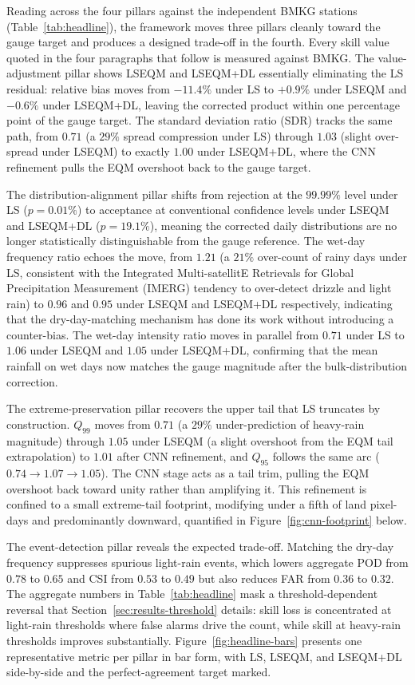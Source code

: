 Reading across the four pillars against the independent BMKG
stations (Table~\ref{tab:headline}), the framework moves three
pillars cleanly toward the gauge target and produces a designed
trade-off in the fourth. Every skill value quoted in the four
paragraphs that follow is measured against BMKG. The value-adjustment pillar shows
LSEQM and LSEQM+DL essentially eliminating the LS residual:
relative bias moves from $-11.4\%$ under LS to $+0.9\%$ under
LSEQM and $-0.6\%$ under LSEQM+DL, leaving the corrected product
within one percentage point of the gauge target. The standard
deviation ratio (SDR) tracks the same path, from $0.71$ (a $29\%$
spread compression under LS) through $1.03$ (slight over-spread
under LSEQM) to exactly $1.00$ under LSEQM+DL, where the CNN
refinement pulls the EQM overshoot back to the gauge target.

The distribution-alignment pillar shifts from rejection at the
$99.99\%$ level under LS ($p = 0.01\%$) to acceptance at
conventional confidence levels under LSEQM and LSEQM+DL ($p =
19.1\%$), meaning the corrected daily distributions are no
longer statistically distinguishable from the gauge reference.
The wet-day frequency ratio echoes the move, from $1.21$ (a
$21\%$ over-count of rainy days under LS, consistent with the
Integrated Multi-satellitE Retrievals for Global Precipitation Measurement (IMERG) tendency to over-detect drizzle and light rain) to $0.96$
and $0.95$ under LSEQM and LSEQM+DL respectively, indicating
that the dry-day-matching mechanism has done its work without
introducing a counter-bias. The wet-day intensity ratio moves
in parallel from $0.71$ under LS to $1.06$ under LSEQM and
$1.05$ under LSEQM+DL, confirming that the mean rainfall on wet
days now matches the gauge magnitude after the bulk-distribution
correction.

The extreme-preservation pillar recovers the upper tail that LS
truncates by construction. $Q_{99}$ moves from $0.71$ (a $29\%$
under-prediction of heavy-rain magnitude) through $1.05$ under
LSEQM (a slight overshoot from the EQM tail extrapolation) to
$1.01$ after CNN refinement, and $Q_{95}$ follows the same arc
($0.74 \rightarrow 1.07 \rightarrow 1.05$). The CNN stage acts
as a tail trim, pulling the EQM overshoot back toward unity
rather than amplifying it. This refinement is confined to a small
extreme-tail footprint, modifying under a fifth of land pixel-days
and predominantly downward, quantified in
Figure~\ref{fig:cnn-footprint} below.

The event-detection pillar reveals the expected trade-off.
Matching the dry-day frequency suppresses spurious light-rain
events, which lowers aggregate POD from $0.78$ to $0.65$ and
CSI from $0.53$ to $0.49$ but also reduces FAR from $0.36$ to
$0.32$. The aggregate numbers in
Table~\ref{tab:headline} mask a threshold-dependent reversal
that Section~\ref{sec:results-threshold} details: skill loss
is concentrated at light-rain thresholds where false alarms
drive the count, while skill at heavy-rain thresholds improves
substantially. Figure~\ref{fig:headline-bars} presents one
representative metric per pillar in bar form, with LS, LSEQM,
and LSEQM+DL side-by-side and the perfect-agreement target
marked.

